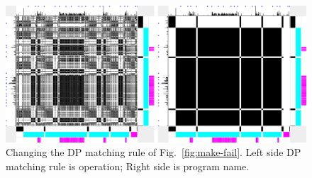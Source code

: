 \begin{figure}[htb]
\begin{center}
\includegraphics[width=1.0\columnwidth]{lviz/make-matching.png}
\caption{Changing the DP matching rule of Fig.~\ref{fig:make-fail}.
Left side DP matching rule is operation; Right side is program name.
}
\label{fig:make-matching}
\end{center}
\end{figure}

